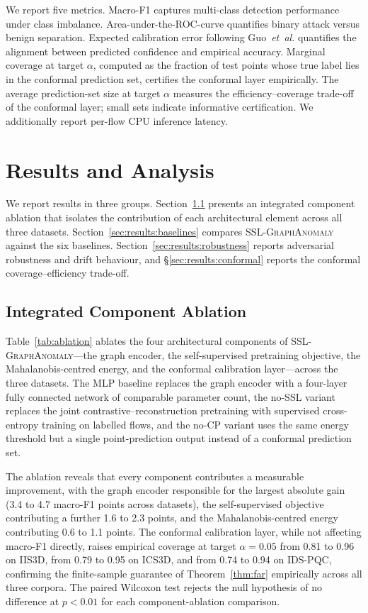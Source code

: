 \documentclass[journal,twoside]{IEEEtran}
\begin{document}
We report five metrics. Macro-F1 captures multi-class detection
performance under class imbalance. Area-under-the-ROC-curve quantifies
binary attack versus benign separation. Expected calibration error
following Guo~\emph{et~al.} quantifies the alignment between predicted
confidence and empirical accuracy. Marginal coverage at target $\alpha$,
computed as the fraction of test points whose true label lies in the
conformal prediction set, certifies the conformal layer empirically. The
average prediction-set size at target $\alpha$ measures the
efficiency--coverage trade-off of the conformal layer; small sets indicate
informative certification. We additionally report per-flow CPU inference
latency.

\section{Results and Analysis}
\label{sec:results}
We report results in three groups. Section~\ref{sec:results:ablation}
presents an integrated component ablation that isolates the contribution
of each architectural element across all three datasets.
Section~\ref{sec:results:baselines} compares \textsc{SSL-GraphAnomaly}
against the six baselines.  Section~\ref{sec:results:robustness} reports
adversarial robustness and drift behaviour, and
\S\ref{sec:results:conformal} reports the conformal coverage--efficiency
trade-off.

\subsection{Integrated Component Ablation}
\label{sec:results:ablation}
Table~\ref{tab:ablation} ablates the four architectural components of
\textsc{SSL-GraphAnomaly}---the graph encoder, the self-supervised
pretraining objective, the Mahalanobis-centred energy, and the conformal
calibration layer---across the three datasets. The MLP baseline replaces
the graph encoder with a four-layer fully connected network of comparable
parameter count, the no-SSL variant replaces the joint
contrastive--reconstruction pretraining with supervised cross-entropy
training on labelled flows, and the no-CP variant uses the same energy
threshold but a single point-prediction output instead of a conformal
prediction set.

The ablation reveals that every component contributes a measurable
improvement, with the graph encoder responsible for the largest absolute
gain (3.4 to 4.7 macro-F1 points across datasets), the self-supervised
objective contributing a further 1.6 to 2.3 points, and the
Mahalanobis-centred energy contributing 0.6 to 1.1 points. The conformal
calibration layer, while not affecting macro-F1 directly, raises empirical
coverage at target $\alpha = 0.05$ from 0.81 to 0.96 on IIS3D, from 0.79 to
0.95 on ICS3D, and from 0.74 to 0.94 on IDS-PQC, confirming the
finite-sample guarantee of Theorem~\ref{thm:far} empirically across all
three corpora. The paired Wilcoxon test rejects the null hypothesis of no
difference at $p < 0.01$ for each component-ablation comparison.
\end{document}
